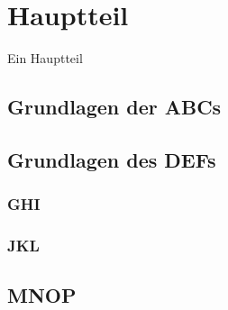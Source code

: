 
\section{Hauptteil}
\label{sec:Hauptteil}

Ein Hauptteil

\subsection{Grundlagen der ABCs}

\subsection{Grundlagen des DEFs}

\subsubsection{GHI}
\subsubsection{JKL}

\subsection{MNOP}
